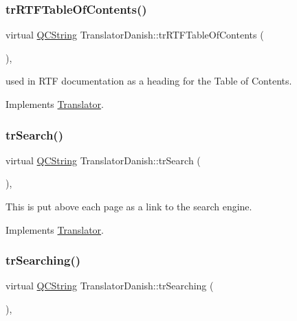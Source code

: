 \subsubsection{\texorpdfstring{trRTFTableOfContents()}{trRTFTableOfContents()}}
{\footnotesize\ttfamily virtual \mbox{\hyperlink{class_q_c_string}{Q\+C\+String}} Translator\+Danish\+::tr\+R\+T\+F\+Table\+Of\+Contents (\begin{DoxyParamCaption}{ }\end{DoxyParamCaption})\hspace{0.3cm}{\ttfamily [inline]}, {\ttfamily [virtual]}}

used in R\+TF documentation as a heading for the Table of Contents. 

Implements \mbox{\hyperlink{class_translator}{Translator}}.

\mbox{\label{class_translator_danish_a4b132405346efb11acbf1268b1f6cc34}} 
\subsubsection{\texorpdfstring{trSearch()}{trSearch()}}
{\footnotesize\ttfamily virtual \mbox{\hyperlink{class_q_c_string}{Q\+C\+String}} Translator\+Danish\+::tr\+Search (\begin{DoxyParamCaption}{ }\end{DoxyParamCaption})\hspace{0.3cm}{\ttfamily [inline]}, {\ttfamily [virtual]}}

This is put above each page as a link to the search engine. 

Implements \mbox{\hyperlink{class_translator}{Translator}}.

\mbox{\label{class_translator_danish_aab046ce1b4220094347ced6badfadb3b}} 
\subsubsection{\texorpdfstring{trSearching()}{trSearching()}}
{\footnotesize\ttfamily virtual \mbox{\hyperlink{class_q_c_string}{Q\+C\+String}} Translator\+Danish\+::tr\+Searching (\begin{DoxyParamCaption}{ }\end{DoxyParamCaption})\hspace{0.3cm}{\ttfamily [inline]}, {\ttfamily [virtual]}}

